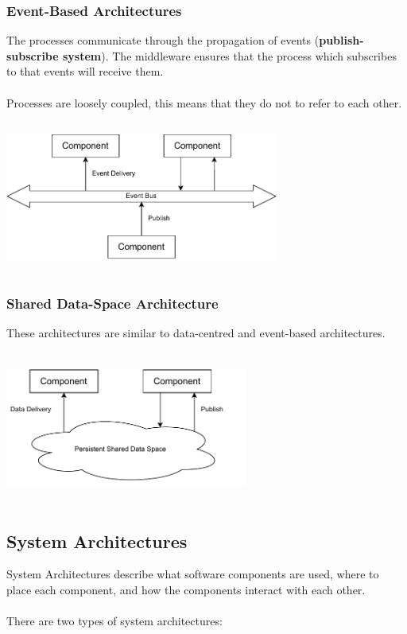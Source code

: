 \documentclass{article}
\begin{document}
\subsubsection{Event-Based Architectures}
The processes communicate through the propagation of events (\textbf{publish-subscribe system}). The middleware ensures that the process which subscribes to that events will receive them. \\ \\
Processes are loosely coupled, this means that they do not to refer to each other.

\begin{center}
	\includegraphics[width=9cm, height=5cm, keepaspectratio]{assets/event-based.pdf}
\end{center}

\subsubsection{Shared Data-Space Architecture}
These architectures are similar to data-centred and event-based architectures.

\begin{center}
	\includegraphics[width=8cm, height=5cm, keepaspectratio]{assets/shared.pdf}
\end{center}

\subsection{System Architectures}
System Architectures describe what software components are used, where to place each component, and how the components interact with each other. \\ \\
There are two types of system architectures:
\end{document}
